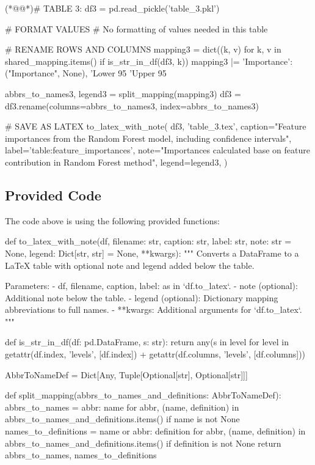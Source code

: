 \documentclass[11pt]{article}
\begin{document}
\begin{python}
(*@@*)# TABLE 3:
df3 = pd.read_pickle('table_3.pkl')

# FORMAT VALUES 
# No formatting of values needed in this table

# RENAME ROWS AND COLUMNS 
mapping3 = dict((k, v) for k, v in shared_mapping.items() if is_str_in_df(df3, k)) 
mapping3 |= {
    'Importance': ("Importance", None),
    'Lower 95%
    'Upper 95%
}

abbrs_to_names3, legend3 = split_mapping(mapping3)
df3 = df3.rename(columns=abbrs_to_names3, index=abbrs_to_names3)

# SAVE AS LATEX
to_latex_with_note(
    df3, 'table_3.tex',
    caption="Feature importances from the Random Forest model, including confidence intervals", 
    label='table:feature_importances',
    note="Importances calculated base on feature contribution in Random Forest method",
    legend=legend3,
)

\end{python}

\subsection{Provided Code}
The code above is using the following provided functions:

\begin{python}
def to_latex_with_note(df, filename: str, caption: str, label: str, note: str = None, legend: Dict[str, str] = None, **kwargs):
    """
    Converts a DataFrame to a LaTeX table with optional note and legend added below the table.

    Parameters:
    - df, filename, caption, label: as in `df.to_latex`.
    - note (optional): Additional note below the table.
    - legend (optional): Dictionary mapping abbreviations to full names.
    - **kwargs: Additional arguments for `df.to_latex`.
    """

def is_str_in_df(df: pd.DataFrame, s: str):
    return any(s in level for level in getattr(df.index, 'levels', [df.index]) + getattr(df.columns, 'levels', [df.columns]))

AbbrToNameDef = Dict[Any, Tuple[Optional[str], Optional[str]]]

def split_mapping(abbrs_to_names_and_definitions: AbbrToNameDef):
    abbrs_to_names = {abbr: name for abbr, (name, definition) in abbrs_to_names_and_definitions.items() if name is not None}
    names_to_definitions = {name or abbr: definition for abbr, (name, definition) in abbrs_to_names_and_definitions.items() if definition is not None}
    return abbrs_to_names, names_to_definitions

\end{python}
\end{document}
